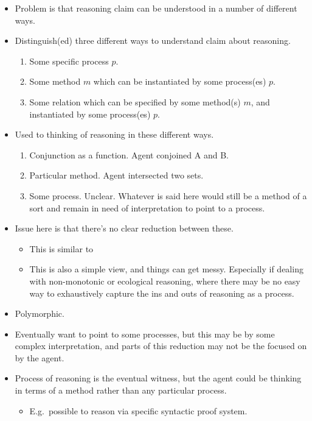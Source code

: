 \documentclass[10pt]{article}
\begin{document}
\begin{itemize}
\item Problem is that reasoning claim can be understood in a number of different ways.
\item Distinguish(ed) three different ways to understand claim about reasoning.
  \begin{enumerate}
  \item Some specific process \(p\).
  \item Some method \(m\) which can be instantiated by some process(es) \(p\).
  \item Some relation which can be specified by some method(s) \(m\), and instantiated by some process(es) \(p\).
  \end{enumerate}
\item Used to thinking of reasoning in these different ways.
  \begin{enumerate}
  \item Conjunction as a function.
    Agent conjoined A and B.
  \item Particular method.
    Agent intersected two sets.
  \item Some process.
    Unclear.
    Whatever is said here would still be a method of a sort and remain in need of interpretation to point to a process.
  \end{enumerate}
\item Issue here is that there's no clear reduction between these.
  \begin{itemize}
  \item This is similar to \textcite{Marr:1982aa}
  \item This is also a simple view, and things can get messy.
    Especially if dealing with non-monotonic or ecological reasoning, where there may be no easy way to exhaustively capture the ins and outs of reasoning as a process.
  \end{itemize}
\item Polymorphic.
\item Eventually want to point to some processes, but this may be by some complex interpretation, and parts of this reduction may not be the focused on by the agent.
\item Process of reasoning is the eventual witness, but the agent could be thinking in terms of a method rather than any particular process.
  \begin{itemize}
  \item E.g.\ possible to reason via specific syntactic proof system.
  \end{itemize}
\end{itemize}
\end{document}
